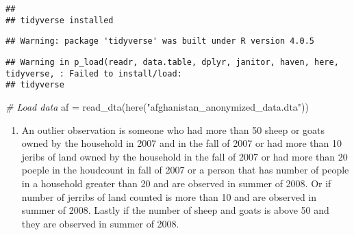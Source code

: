\documentclass[
]{article}
\newenvironment{Shaded}{\begin{snugshade}}{\end{snugshade}}
\newcommand{\CommentTok}[1]{\textcolor[rgb]{0.56,0.35,0.01}{\textit{#1}}}
\newcommand{\FunctionTok}[1]{\textcolor[rgb]{0.00,0.00,0.00}{#1}}
\newcommand{\NormalTok}[1]{#1}
\newcommand{\OtherTok}[1]{\textcolor[rgb]{0.56,0.35,0.01}{#1}}
\newcommand{\StringTok}[1]{\textcolor[rgb]{0.31,0.60,0.02}{#1}}
\providecommand{\tightlist}{%
  \setlength{\itemsep}{0pt}\setlength{\parskip}{0pt}}
\begin{document}
\begin{verbatim}
## 
## tidyverse installed
\end{verbatim}

\begin{verbatim}
## Warning: package 'tidyverse' was built under R version 4.0.5
\end{verbatim}

\begin{verbatim}
## Warning in p_load(readr, data.table, dplyr, janitor, haven, here, tidyverse, : Failed to install/load:
## tidyverse
\end{verbatim}

\begin{Shaded}
\begin{Highlighting}[]
\CommentTok{\# Load data}
\NormalTok{af }\OtherTok{=} \FunctionTok{read\_dta}\NormalTok{(}\FunctionTok{here}\NormalTok{(}\StringTok{"afghanistan\_anonymized\_data.dta"}\NormalTok{)) }
\end{Highlighting}
\end{Shaded}

\begin{enumerate}
\def\labelenumi{\arabic{enumi}.}
\tightlist
\item
  An outlier observation is someone who had more than 50 sheep or goats
  owned by the household in 2007 and in the fall of 2007 or had more
  than 10 jeribs of land owned by the household in the fall of 2007 or
  had more than 20 poeple in the houdcount in fall of 2007 or a person
  that has number of people in a household greater than 20 and are
  observed in summer of 2008. Or if number of jerribs of land counted is
  more than 10 and are observed in summer of 2008. Lastly if the number
  of sheep and goats is above 50 and they are observed in summer of
  2008.
\end{enumerate}
\end{document}
